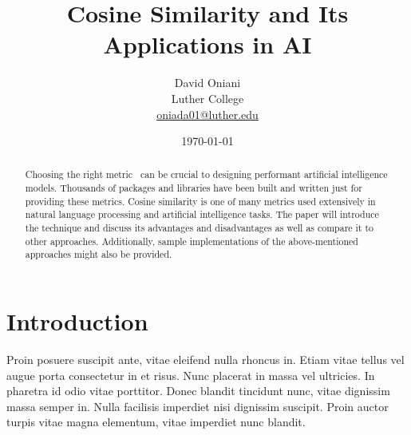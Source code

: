 \documentclass[11pt]{article}
\author{David Oniani\\
        Luther College\\
        \href{mailto:oniada01@luther.edu}{oniada01@luther.edu}}
\title{\textbf{Cosine Similarity and Its Applications in AI}}
\date{\today}
\begin{document}
\maketitle


\begin{abstract}
  \noindent Choosing the right metric~\cite{thomas} can be crucial to designing
  performant artificial intelligence models. Thousands of packages and
  libraries have been built and written just for providing these metrics.
  Cosine similarity is one of many metrics used extensively in natural language
  processing and artificial intelligence tasks. The paper will introduce the
  technique and discuss its advantages and disadvantages as well as compare it
  to other approaches. Additionally, sample implementations of the
  above-mentioned approaches might also be provided.
\end{abstract}


\newpage
\tableofcontents
\newpage


\section{Introduction}

Proin posuere suscipit ante, vitae eleifend nulla rhoncus in. Etiam vitae
tellus vel augue porta consectetur in et risus. Nunc placerat in massa vel
ultricies. In pharetra id odio vitae porttitor. Donec blandit tincidunt nunc,
vitae dignissim massa semper in. Nulla facilisis imperdiet nisi dignissim
suscipit. Proin auctor turpis vitae magna elementum, vitae imperdiet nunc
blandit.


\printbibliography[heading=bibintoc]

\end{document}
